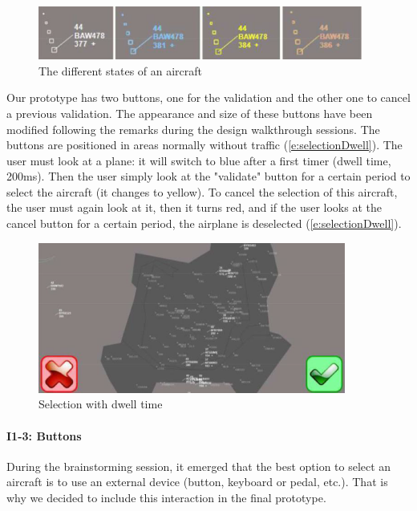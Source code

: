 \begin{figure}
 \centering
	\includegraphics[width=0.95\textwidth]{Figures/selectionState.png}
	\caption{ The different states of an aircraft}
	\label{e:selectionState}
\end{figure}

Our prototype has two buttons, one for the validation and the
other one to cancel a previous validation. The appearance
and size of these buttons have been modified following the
remarks during the design walkthrough sessions. The
buttons are positioned in areas normally without traffic
(\autoref{e:selectionDwell}). The user must look at a plane: it will switch to
blue after a first timer (dwell time, 200ms). Then the user
simply look at the "validate" button for a certain period to
select the aircraft (it changes to yellow). To cancel the
selection of this aircraft, the user must again look at it, then it turns red, and if the user looks at the cancel
button for a certain period, the airplane is deselected (\autoref{e:selectionDwell}).

\begin{figure}
 \centering
	\includegraphics[width=0.90\textwidth]{Figures/selectionDwell.png}
	\caption{ Selection with dwell time}
	\label{e:selectionDwell}
\end{figure}



\paragraph{I1-3: Buttons}
During the brainstorming session, it emerged that the best
option to select an aircraft is to use an external device
(button, keyboard or pedal, etc.). That is why we decided to
include this interaction in the final prototype.

